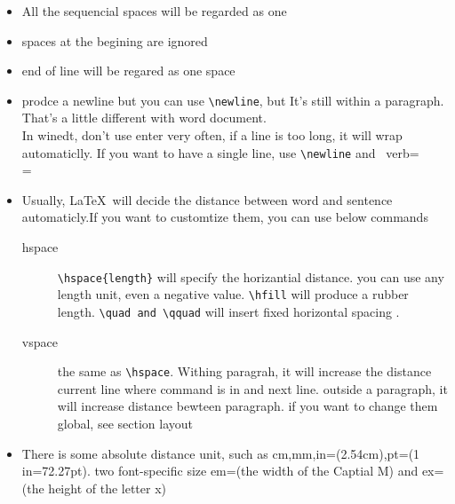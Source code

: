 \documentclass[a4paper,12pt,twoside]{book}
\begin{document}
		\begin{itemize}
		\item All the sequencial spaces will be regarded as one
		\item spaces at the begining are ignored
		\item end of line will be regared as one space
		\item prodce a newline but you can use \verb=\newline=, but It's still within a paragraph. That's a little different with word document.
\\
In winedt, don't use enter very often, if a line is too long, it will wrap automaticlly.  If you want to have a single line, use   \verb=\newline= and \ verb=\\=

		\item Usually, \LaTeX\ will decide the distance between word and sentence automaticly.If you want to customtize them, you can use below commands
			\begin{description}
			\item[hspace]
			\verb=\hspace{length}= will specify the horizantial distance. you can use any length unit, even a negative value.
			\verb=\hfill= will produce a rubber length.
			\verb=\quad and \qquad= will insert fixed horizontal spacing .
			\item[vspace]
			the same as \verb=\hspace=. Withing paragrah, it will increase the distance current line where command is in and next line.
			outside a paragraph, it will increase distance bewteen paragraph. if you want to change them global, see section layout
			\end{description}
		\item There is some absolute distance unit, such as cm,mm,in=(2.54cm),pt=(1 in=72.27pt). two font-specific size em=(the width of the Captial M) and ex=(the height of the letter x)
		\end{itemize}
\end{document}

